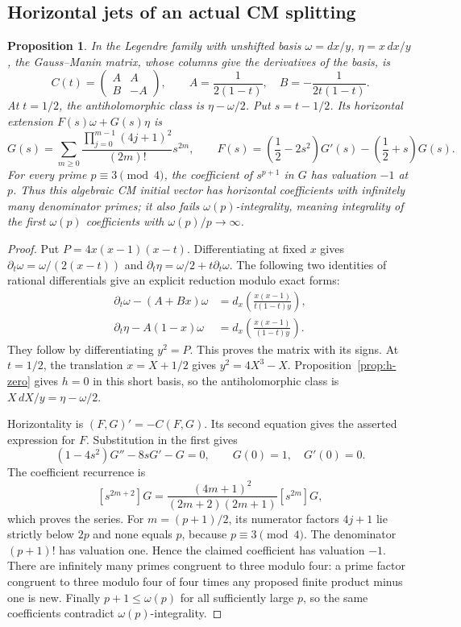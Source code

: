 \documentclass[11pt]{article}
\newtheorem{proposition}[theorem]{Proposition}
\theoremstyle{definition}\newtheorem{definition}[theorem]{Definition}
\theoremstyle{remark}\newtheorem{remark}[theorem]{Remark}
\begin{document}
\subsection{Horizontal jets of an actual CM splitting}
\begin{proposition}\label{prop:cm-horizontal-jets}
In the Legendre family with unshifted basis $\omega=dx/y$, $\eta=x\,dx/y$, the Gauss--Manin matrix, whose columns give the derivatives of the basis, is
\[
 C(t)=\begin{pmatrix}A&A\\B&-A\end{pmatrix},\qquad
 A=\frac1{2(1-t)},\quad B=-\frac1{2t(1-t)}.
\]
At $t=1/2$, the antiholomorphic class is $\eta-\omega/2$. Put $s=t-1/2$. Its horizontal extension $F(s)\omega+G(s)\eta$ is
\[
 G(s)=\sum_{m\ge0}\frac{\prod_{j=0}^{m-1}(4j+1)^2}{(2m)!}s^{2m},\qquad
 F(s)=\left(\frac12-2s^2\right)G'(s)-\left(\frac12+s\right)G(s).
\]
For every prime $p\equiv3\pmod4$, the coefficient of $s^{p+1}$ in $G$ has valuation $-1$ at $p$. Thus this algebraic CM initial vector has horizontal coefficients with infinitely many denominator primes; it also fails $\omega(p)$-integrality, meaning integrality of the first $\omega(p)$ coefficients with $\omega(p)/p\to\infty$.
\end{proposition}
\begin{proof}
Put $P=4x(x-1)(x-t)$. Differentiating at fixed $x$ gives
$\partial_t\omega=\omega/(2(x-t))$ and
$\partial_t\eta=\omega/2+t\partial_t\omega$.
The following two identities of rational differentials give an explicit reduction modulo exact forms:
\[
 \begin{split}
 \partial_t\omega-(A+Bx)\omega
       &=d_x\left(\frac{x(x-1)}{t(1-t)y}\right),\\
 \partial_t\eta-A(1-x)\omega
       &=d_x\left(\frac{x(x-1)}{(1-t)y}\right).
 \end{split}
\]
They follow by differentiating $y^2=P$. This proves the matrix with its signs. At $t=1/2$, the translation $x=X+1/2$ gives $y^2=4X^3-X$. Proposition~\ref{prop:h-zero} gives $h=0$ in this short basis, so the antiholomorphic class is $X\,dX/y=\eta-\omega/2$.

Horizontality is $(F,G)'=-C(F,G)$. Its second equation gives the asserted expression for $F$. Substitution in the first gives
\[
       (1-4s^2)G''-8sG'-G=0,\qquad G(0)=1,\quad G'(0)=0.
\]
The coefficient recurrence is
\[
 [s^{2m+2}]G=\frac{(4m+1)^2}{(2m+2)(2m+1)}[s^{2m}]G,
\]
which proves the series. For $m=(p+1)/2$, its numerator factors $4j+1$ lie strictly below $2p$ and none equals $p$, because $p\equiv3\pmod4$. The denominator $(p+1)!$ has valuation one. Hence the claimed coefficient has valuation $-1$. There are infinitely many primes congruent to three modulo four: a prime factor congruent to three modulo four of four times any proposed finite product minus one is new. Finally $p+1\le\omega(p)$ for all sufficiently large $p$, so the same coefficients contradict $\omega(p)$-integrality.
\end{proof}
\end{document}
